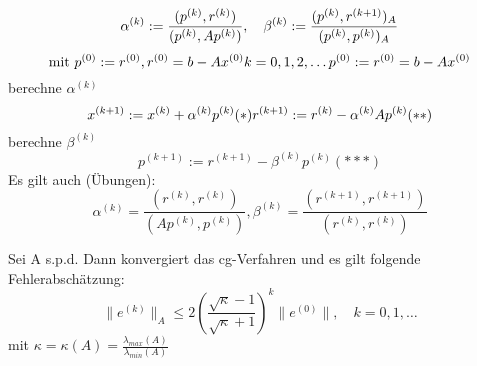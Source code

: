 \begin{algorithmus}
  \[
    \alpha^{(k)} := \frac{(p^{(k)},r^{(k)})}{(p^{(k)},Ap^{(k)})},\quad
    \beta^{(k)} := \frac{(p^{(k)},r^{(k+1)})_A}{(p^{(k)},p^{(k)})_A}\\
  \]
  \[
    \text{mit } p^{(0)}:=r^{(0)}, r^{(0)}=b-Ax^{(0)}
    k=0,1,2,\ldots\\
    p^{(0)}:= r^{(0)} = b-Ax^{(0)}\\
  \]
  berechne $\alpha^{(k)}$
  \[
    x^{(k+1)}:=x^{(k)}+\alpha^{(k)}p^{(k)}\\ (*)
    r^{(k+1)}:=r^{(k)} -\alpha^{(k)}Ap^{(k)} (**)
  \]
  berechne $\beta^{(k)}$
  \[
    p^{(k+1)}:=r^{(k+1)}-\beta^{(k)}p^{(k)} (***)
  \]
  Es gilt auch (Übungen):
  \[
    \alpha^{(k)} = \frac{(r^{(k)},r^{(k)})}{(Ap^{(k)},p^{(k)})}, \beta^{(k)}=\frac{(r^{(k+1)},r^{(k+1)})}{(r^{(k)},r^{(k)})}
  \]
\end{algorithmus}

\begin{satz}[1.3.3]
  Sei A s.p.d. Dann konvergiert das cg-Verfahren und es gilt folgende Fehlerabschätzung:
  \[
    \|e^{(k)}\|_A \leq 2 \left( \frac{\sqrt{\kappa}-1}{\sqrt{\kappa}+1} \right)^k \|e^{(0)}\|, \quad k=0,1,\ldots
  \]
  mit $\kappa = \kappa(A) = \frac{\lambda_{max}(A)}{\lambda_{min}(A)}$
\end{satz}


